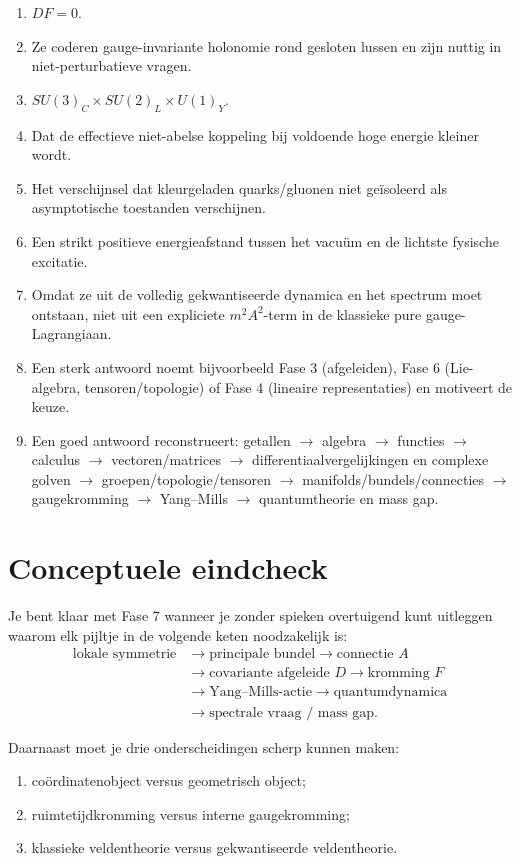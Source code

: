 \documentclass[11pt,a4paper]{article}
\begin{document}
\begin{enumerate}
\item $DF=0$.
\item Ze coderen gauge-invariante holonomie rond gesloten lussen en zijn nuttig in niet-perturbatieve vragen.
\item $SU(3)_C\times SU(2)_L\times U(1)_Y$.
\item Dat de effectieve niet-abelse koppeling bij voldoende hoge energie kleiner wordt.
\item Het verschijnsel dat kleurgeladen quarks/gluonen niet geïsoleerd als asymptotische toestanden verschijnen.
\item Een strikt positieve energieafstand tussen het vacuüm en de lichtste fysische excitatie.
\item Omdat ze uit de volledig gekwantiseerde dynamica en het spectrum moet ontstaan, niet uit een expliciete $m^2A^2$-term in de klassieke pure gauge-Lagrangiaan.
\item Een sterk antwoord noemt bijvoorbeeld Fase 3 (afgeleiden), Fase 6 (Lie-algebra, tensoren/topologie) of Fase 4 (lineaire representaties) en motiveert de keuze.
\item Een goed antwoord reconstrueert: getallen $\to$ algebra $\to$ functies $\to$ calculus $\to$ vectoren/matrices $\to$ differentiaalvergelijkingen en complexe golven $\to$ groepen/topologie/tensoren $\to$ manifolds/bundels/connecties $\to$ gaugekromming $\to$ Yang--Mills $\to$ quantumtheorie en mass gap.
\end{enumerate}

\section{Conceptuele eindcheck}

Je bent klaar met Fase 7 wanneer je zonder spieken overtuigend kunt uitleggen waarom elk pijltje in de volgende keten noodzakelijk is:
\[
\begin{aligned}
\text{lokale symmetrie} &\to \text{principale bundel} \to \text{connectie }A \\
&\to \text{covariante afgeleide }D \to \text{kromming }F \\
&\to \text{Yang--Mills-actie} \to \text{quantumdynamica} \\
&\to \text{spectrale vraag / mass gap}.
\end{aligned}
\]

Daarnaast moet je drie onderscheidingen scherp kunnen maken:
\begin{enumerate}
\item coördinatenobject versus geometrisch object;
\item ruimtetijdkromming versus interne gaugekromming;
\item klassieke veldentheorie versus gekwantiseerde veldentheorie.
\end{enumerate}
\end{document}
